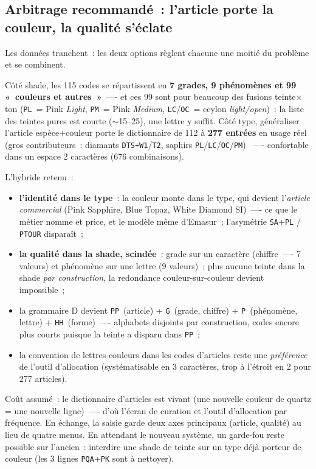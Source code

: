 \documentclass[11pt,a4paper]{article}
\newcommand{\code}[1]{\texttt{#1}}
\begin{document}
\subsection{Arbitrage recommandé~: l'article porte la couleur, la qualité
s'éclate}
\label{sec:axes}

Les données tranchent~: les deux options règlent chacune une moitié du
problème et se combinent.

Côté shade, les 115 codes se répartissent en \textbf{7 grades, 9
phénomènes et 99 «~couleurs et autres~»}~—- et ces 99 sont pour beaucoup
des fusions teinte$\times$ton (\code{PL}~= Pink \emph{Light}, \code{PM}~=
Pink \emph{Medium}, \code{LC}/\code{OC}~= ceylon \emph{light/open})~: la
liste des teintes pures est courte ($\sim$15--25), une lettre y suffit.
Côté type, généraliser l'article espèce+couleur porte le dictionnaire de
112 à \textbf{277 entrées} en usage réel (gros contributeurs~: diamants
\code{DTS+W1}/\code{T2}, saphirs \code{PL}/\code{LC}/\code{OC}/\code{PM})
~—- confortable dans un espace 2 caractères (676 combinaisons).

L'hybride retenu~:
\begin{itemize}
\item \textbf{l'identité dans le type}~: la couleur monte dans le type,
  qui devient l'\emph{article commercial} (Pink Sapphire, Blue Topaz,
  White Diamond SI)~—- ce que le métier nomme et price, et le modèle
  même d'Emasur~; l'asymétrie \code{SA}+\code{PL} / \code{PTOUR}
  disparaît~;
\item \textbf{la qualité dans la shade, scindée}~: grade sur un
  caractère (chiffre~—- 7 valeurs) et phénomène sur une lettre (9
  valeurs)~; plus aucune teinte dans la shade \emph{par construction},
  la redondance couleur-sur-couleur devient impossible~;
\item la grammaire D devient \code{PP}~(article) + \code{G}~(grade,
  chiffre) + \code{P}~(phénomène, lettre) + \code{HH}~(forme)~—-
  alphabets disjoints par construction, codes encore plus courts
  puisque la teinte a disparu dans \code{PP}~;
\item la convention de lettres-couleurs dans les codes d'articles reste
  une \emph{préférence} de l'outil d'allocation (systématisable en
  3 caractères, trop à l'étroit en 2 pour 277 articles).
\end{itemize}

Coût assumé~: le dictionnaire d'articles est vivant (une nouvelle couleur
de quartz = une nouvelle ligne)~—- d'où l'écran de curation et l'outil
d'allocation par fréquence. En échange, la saisie garde deux axes
principaux (article, qualité) au lieu de quatre menus. En attendant le
nouveau système, un garde-fou reste possible sur l'ancien~: interdire une
shade de teinte sur un type déjà porteur de couleur (les 3 lignes
\code{PQA}+\code{PK} sont à nettoyer).
\end{document}
